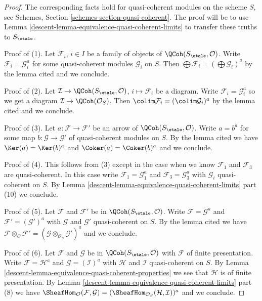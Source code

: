 \begin{proof}

The corresponding facts hold for quasi-coherent modules on the scheme $S$,
see Schemes, Section \ref{schemes-section-quasi-coherent}. The proof will
be to use Lemma \ref{descent-lemma-equivalence-quasi-coherent-limits} to transfer
these truths to $S_\etale$.

\medskip\noindent
Proof of (1). Let $\mathcal{F}_i$, $i \in I$ be a family of objects of
$\QCoh(S_\etale, \mathcal{O})$. Write $\mathcal{F}_i = \mathcal{G}_i^a$
for some quasi-coherent modules $\mathcal{G}_i$ on $S$.
Then $\bigoplus \mathcal{F}_i = (\bigoplus \mathcal{G}_i)^a$ by
the lemma cited and we conclude.

\medskip\noindent
Proof of (2). Let $\mathcal{I} \to \QCoh(S_\etale, \mathcal{O})$,
$i \mapsto \mathcal{F}_i$ be a diagram. Write
$\mathcal{F}_i = \mathcal{G}_i^a$ so we get a diagram
$\mathcal{I} \to \QCoh(\mathcal{O}_S)$.
Then $\colim \mathcal{F}_i = (\colim \mathcal{G}_i)^a$ by
the lemma cited and we conclude.

\medskip\noindent
Proof of (3). Let $a : \mathcal{F} \to \mathcal{F}'$
be an arrow of $\QCoh(S_\etale, \mathcal{O})$.
Write $a = b^a$ for some map $b : \mathcal{G} \to \mathcal{G}'$
of quasi-coherent modules on $S$. By the lemma cited
we have $\Ker(a) = \Ker(b)^a$ and $\Coker(a) = \Coker(b)^a$
and we conclude.

\medskip\noindent
Proof of (4). This follows from (3) except in the case when
we know $\mathcal{F}_1$ and $\mathcal{F}_3$ are quasi-coherent.
In this case write $\mathcal{F}_1 = \mathcal{G}_1^a$
and $\mathcal{F}_3 = \mathcal{G}_3^a$ with
$\mathcal{G}_i$ quasi-coherent on $S$.
By Lemma \ref{descent-lemma-equivalence-quasi-coherent-limits} part (10)
we conclude.

\medskip\noindent
Proof of (5). Let $\mathcal{F}$ and $\mathcal{F}'$
be in $\QCoh(S_\etale, \mathcal{O})$.
Write $\mathcal{F} = \mathcal{G}^a$
and $\mathcal{F}' = (\mathcal{G}')^a$
with $\mathcal{G}$ and $\mathcal{G}'$ quasi-coherent on $S$.
By the lemma cited we have
$\mathcal{F} \otimes_\mathcal{O} \mathcal{F}' =
(\mathcal{G} \otimes_{\mathcal{O}_S} \mathcal{G}')^a$
and we conclude.

\medskip\noindent
Proof of (6). Let $\mathcal{F}$ and $\mathcal{G}$
be in $\QCoh(S_\etale, \mathcal{O})$ with $\mathcal{F}$
of finite presentation. Write $\mathcal{F} = \mathcal{H}^a$
and $\mathcal{G} = (\mathcal{I})^a$
with $\mathcal{H}$ and $\mathcal{I}$ quasi-coherent on $S$.
By Lemma \ref{descent-lemma-equivalence-quasi-coherent-properties}
we see that $\mathcal{H}$ is of finite presentation.
By Lemma \ref{descent-lemma-equivalence-quasi-coherent-limits} part (8)
we have
$\SheafHom_\mathcal{O}(\mathcal{F}, \mathcal{G}) =
(\SheafHom_{\mathcal{O}_S}(\mathcal{H}, \mathcal{I}))^a$
and we conclude.
\end{proof}

